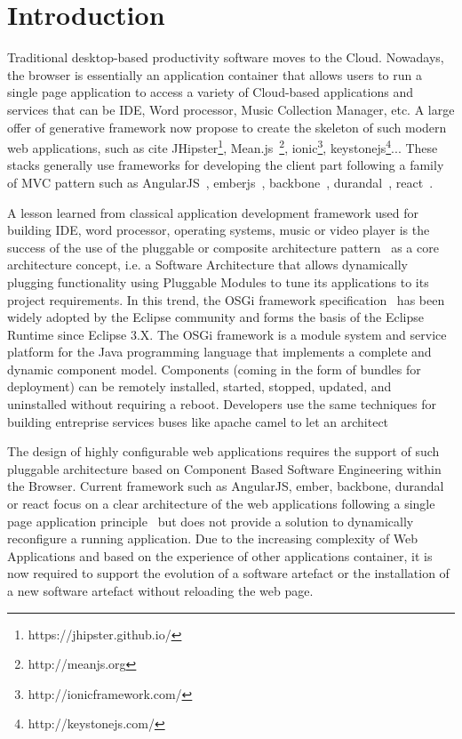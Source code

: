 \section{Introduction}

Traditional desktop-based productivity software moves to the Cloud. 
Nowadays, the browser is essentially an application container that allows users to run a single page application to  access a variety of Cloud-based applications and services that can be IDE, Word processor, Music Collection Manager, etc. 
A large offer of generative framework now propose to create the skeleton of such modern web applications, such as cite JHipster\footnote{https://jhipster.github.io/}, Mean.js~\footnote{http://meanjs.org}, ionic\footnote{http://ionicframework.com/}, keystonejs\footnote{http://keystonejs.com/}... 
These stacks generally use frameworks for developing the client part following a family of MVC pattern such as AngularJS~\cite{green2013angularjs}, emberjs~\cite{cravens2014building}, backbone~\cite{osmani2013developing}, durandal~\cite{monteiro2014learning}, react~\cite{fedosejev2015react}.  

A lesson learned from classical application development framework used for building IDE, word processor, operating systems, music or video player is the success of the use of the pluggable or composite architecture pattern~\cite{115158,schmidt2013pattern} as a core architecture concept,  i.e. a Software Architecture that allows dynamically plugging functionality using Pluggable Modules to tune its applications to its project requirements. In this trend, the OSGi framework specification~\cite{hall2011osgi} has been widely adopted by the Eclipse community and forms the basis of the Eclipse Runtime since Eclipse 3.X. The OSGi framework is a module system and service platform for the Java programming language that implements a complete and dynamic component model. Components (coming in the form of bundles for deployment) can be remotely installed, started, stopped, updated, and uninstalled without requiring a reboot. Developers use the same techniques for building entreprise services buses like apache camel to let an architect  

The design of highly configurable web applications requires the support of such pluggable architecture based on Component Based Software Engineering within the Browser. Current framework such as AngularJS, ember, backbone, durandal or react focus on a clear architecture of the web applications following a single page application principle~\cite{monteiro2014learning} but does not provide a solution to dynamically reconfigure a running application. Due to the increasing complexity of Web Applications and based on the experience of other applications container, it is now required to support the evolution of a software artefact or the installation of a new software artefact without reloading the web page.  

